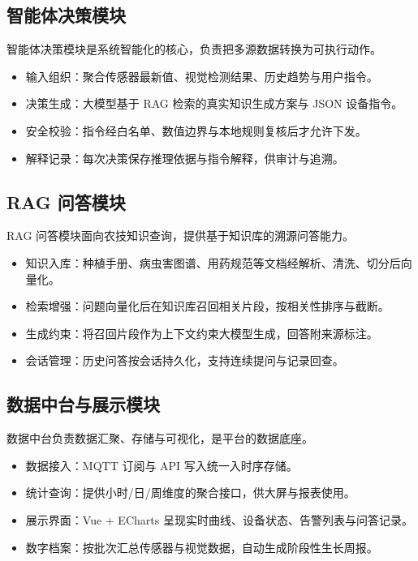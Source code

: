 \documentclass[11pt]{ctexart}
\begin{document}
\subsection{智能体决策模块}
智能体决策模块是系统智能化的核心，负责把多源数据转换为可执行动作。

\begin{itemize}
  \item 输入组织：聚合传感器最新值、视觉检测结果、历史趋势与用户指令。
  \item 决策生成：大模型基于 RAG 检索的真实知识生成方案与 JSON 设备指令。
  \item 安全校验：指令经白名单、数值边界与本地规则复核后才允许下发。
  \item 解释记录：每次决策保存推理依据与指令解释，供审计与追溯。
\end{itemize}

\subsection{RAG 问答模块}
RAG 问答模块面向农技知识查询，提供基于知识库的溯源问答能力。

\begin{itemize}
  \item 知识入库：种植手册、病虫害图谱、用药规范等文档经解析、清洗、切分后向量化。
  \item 检索增强：问题向量化后在知识库召回相关片段，按相关性排序与截断。
  \item 生成约束：将召回片段作为上下文约束大模型生成，回答附来源标注。
  \item 会话管理：历史问答按会话持久化，支持连续提问与记录回查。
\end{itemize}

\subsection{数据中台与展示模块}
数据中台负责数据汇聚、存储与可视化，是平台的数据底座。

\begin{itemize}
  \item 数据接入：MQTT 订阅与 API 写入统一入时序存储。
  \item 统计查询：提供小时/日/周维度的聚合接口，供大屏与报表使用。
  \item 展示界面：Vue + ECharts 呈现实时曲线、设备状态、告警列表与问答记录。
  \item 数字档案：按批次汇总传感器与视觉数据，自动生成阶段性生长周报。
\end{itemize}
\end{document}
